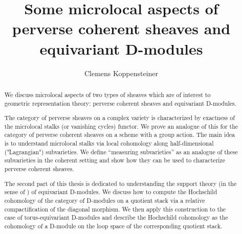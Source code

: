 \documentclass[english]{thesis}
\title{Some microlocal aspects of perverse coherent sheaves and equivariant D-modules}
\author{Clemens Koppensteiner}
\begin{document}
\frontmatter

\maketitlepage

\begin{abstract}
    We discuss microlocal aspects of two types of sheaves which are of interest to geometric representation theory: perverse coherent sheaves and equivariant D-modules.

    The category of perverse sheaves on a complex variety is characterized by exactness of the microlocal stalks (or vanishing cycles) functor.
    We prove an analogue of this for the category of perverse coherent sheaves on a scheme with a group action.
    The main idea is to understand microlocal stalks via local cohomology along half-dimensional ("Lagrangian") subvarieties.
    We define \enquote{measuring subvarieties} as an analogue of these subvarieties in the coherent setting and show how they can be used to characterize perverse coherent sheaves.

    The second part of this thesis is dedicated to understanding the support theory (in the sense of \cite{BensonIyengarKrause:2008:LocalCohomologyAndSupportForTriangulatedCategories}) of equivariant D-modules.
    We discuss how to compute the Hochschild cohomology of the category of D-modules on a quotient stack via a relative compactification of the diagonal morphism.
    We then apply this construction to the case of torus-equivariant D-modules and describe the Hochschild cohomology as the cohomology of a D-module on the loop space of the corresponding quotient stack.
\end{abstract}



\tableofcontents

\mainmatter





\backmatter
{}
\printbibliography
\end{document}
